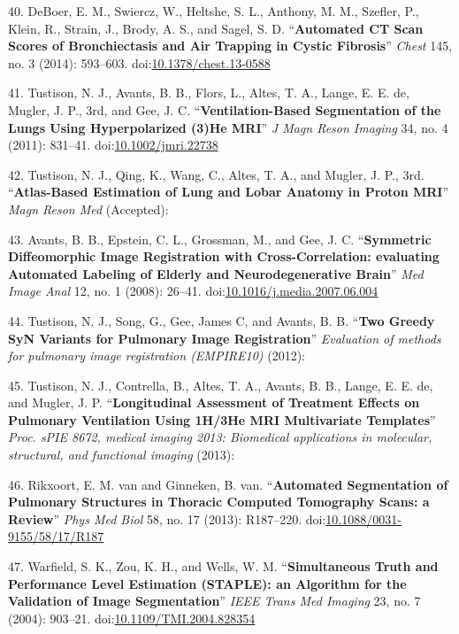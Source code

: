 \documentclass[11pt,]{article}
\begin{document}
40. DeBoer, E. M., Swiercz, W., Heltshe, S. L., Anthony, M. M., Szefler,
P., Klein, R., Strain, J., Brody, A. S., and Sagel, S. D.
``\textbf{Automated CT Scan Scores of Bronchiectasis and Air Trapping in
Cystic Fibrosis}'' \emph{Chest} 145, no. 3 (2014): 593--603.
doi:\href{http://dx.doi.org/10.1378/chest.13-0588}{10.1378/chest.13-0588}

41. Tustison, N. J., Avants, B. B., Flors, L., Altes, T. A., Lange, E.
E. de, Mugler, J. P., 3rd, and Gee, J. C. ``\textbf{Ventilation-Based
Segmentation of the Lungs Using Hyperpolarized (3)He MRI}'' \emph{J Magn
Reson Imaging} 34, no. 4 (2011): 831--41.
doi:\href{http://dx.doi.org/10.1002/jmri.22738}{10.1002/jmri.22738}

42. Tustison, N. J., Qing, K., Wang, C., Altes, T. A., and Mugler, J.
P., 3rd. ``\textbf{Atlas-Based Estimation of Lung and Lobar Anatomy in
Proton MRI}'' \emph{Magn Reson Med} (Accepted):

43. Avants, B. B., Epstein, C. L., Grossman, M., and Gee, J. C.
``\textbf{Symmetric Diffeomorphic Image Registration with
Cross-Correlation: evaluating Automated Labeling of Elderly and
Neurodegenerative Brain}'' \emph{Med Image Anal} 12, no. 1 (2008):
26--41.
doi:\href{http://dx.doi.org/10.1016/j.media.2007.06.004}{10.1016/j.media.2007.06.004}

44. Tustison, N. J., Song, G., Gee, James C, and Avants, B. B.
``\textbf{Two Greedy SyN Variants for Pulmonary Image Registration}''
\emph{Evaluation of methods for pulmonary image registration (EMPIRE10)}
(2012):

45. Tustison, N. J., Contrella, B., Altes, T. A., Avants, B. B., Lange,
E. E. de, and Mugler, J. P. ``\textbf{Longitudinal Assessment of
Treatment Effects on Pulmonary Ventilation Using 1H/3He MRI Multivariate
Templates}'' \emph{Proc. sPIE 8672, medical imaging 2013: Biomedical
applications in molecular, structural, and functional imaging} (2013):

46. Rikxoort, E. M. van and Ginneken, B. van. ``\textbf{Automated
Segmentation of Pulmonary Structures in Thoracic Computed Tomography
Scans: a Review}'' \emph{Phys Med Biol} 58, no. 17 (2013): R187--220.
doi:\href{http://dx.doi.org/10.1088/0031-9155/58/17/R187}{10.1088/0031-9155/58/17/R187}

47. Warfield, S. K., Zou, K. H., and Wells, W. M. ``\textbf{Simultaneous
Truth and Performance Level Estimation (STAPLE): an Algorithm for the
Validation of Image Segmentation}'' \emph{IEEE Trans Med Imaging} 23,
no. 7 (2004): 903--21.
doi:\href{http://dx.doi.org/10.1109/TMI.2004.828354}{10.1109/TMI.2004.828354}
\end{document}
